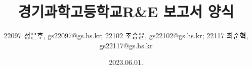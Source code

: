 \title{경기과학고등학교\linebreak R\&E 보고서 양식}
\author{22097 정은후, gs22097@gs.hs.kr; 22102 조승윤, gs22102@gs.hs.kr; 22117 최준혁, gs22117@gs.hs.kr}
\date{2023.06.01.}
